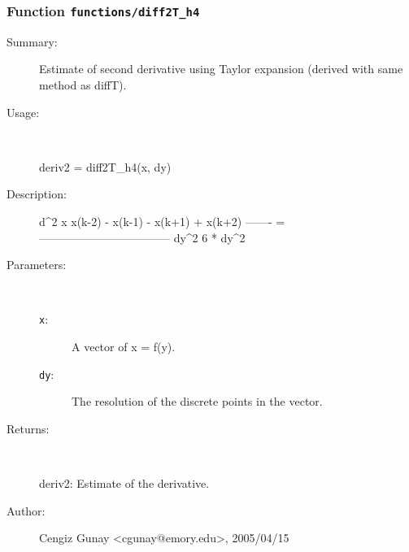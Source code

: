 \subsubsection[Function \texttt{diff2T\_h4}]{Function \texttt{functions/diff2T\_h4}}%
%
\label{ref_functions__diff2T_h4}%
\hypertarget{ref_functions__diff2T_h4}{}%
\begin{description}
\item[Summary:]Estimate of second derivative using Taylor expansion (derived with same method as diffT).
%
\item[Usage:]~%
\begin{lyxcode}%
deriv2 = diff2T\_h4(x, dy)
%
\end{lyxcode}%
%
\item[Description:]%
d\textasciicircum{}2 x     x(k-2) - x(k-1) - x(k+1) + x(k+2)
  ------- = -----------------------------------
   dy\textasciicircum{}2		6 * dy\textasciicircum{}2
\item[Parameters:]~
\begin{description}%
\item[\texttt{x}:]
 A vector of x = f(y).
\item[\texttt{dy}:]
 The resolution of the discrete points in the vector.
\end{description}%
%
\item[Returns:
]~

 	deriv2: Estimate of the derivative.
%
%
%
\item[Author:]%
Cengiz Gunay <cgunay@emory.edu>, 2005/04/15
%
\end{description}
\methodline%
